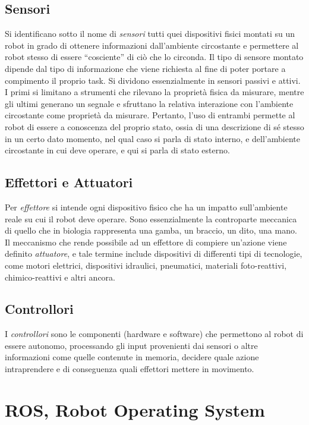 \subsection{Sensori} 
Si identificano sotto il nome di \textit{sensori} tutti quei dispositivi fisici montati su un robot in grado di ottenere informazioni dall’ambiente circostante e permettere al robot stesso di essere ``cosciente'' di ciò che lo circonda. Il tipo di sensore montato dipende dal tipo di informazione che viene richiesta al fine di poter portare a compimento il proprio task. Si dividono essenzialmente in sensori passivi e attivi.\\ I primi si limitano a strumenti che rilevano la proprietà fisica da misurare, mentre gli ultimi generano un segnale e sfruttano la relativa interazione con l’ambiente circostante come proprietà da misurare. Pertanto, l’uso di entrambi permette al robot di essere a conoscenza del proprio stato, ossia di una descrizione di sé stesso in un certo dato momento, nel qual caso si parla di stato interno, e dell’ambiente circostante in cui deve operare, e qui si parla di stato esterno. 

\subsection{Effettori e Attuatori} 
Per \textit{effettore} si intende ogni dispositivo fisico che ha un impatto sull’ambiente reale su cui il robot deve operare. Sono essenzialmente la controparte meccanica di quello che in biologia rappresenta una gamba, un braccio, un dito, una mano. Il meccanismo che rende possibile ad un effettore di compiere un’azione viene definito \textit{attuatore}, e tale termine include dispositivi di differenti tipi di tecnologie, come motori elettrici, dispositivi idraulici, pneumatici, materiali foto-reattivi, chimico-reattivi e altri ancora. 

\subsection{Controllori} 
I \textit{controllori} sono le componenti (hardware e software) che permettono al robot di essere autonomo, processando gli input provenienti dai sensori o altre informazioni come quelle contenute in memoria, decidere quale azione intraprendere e di conseguenza quali effettori mettere in movimento. 

\section{ROS, Robot Operating System}

